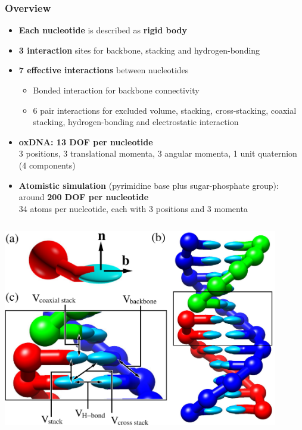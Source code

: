 \documentclass[slidestop,compress,9pt]{beamer}
\begin{document}
\begin{frame}
\frametitle{Overview}

\begin{itemize}
\item \textbf{Each nucleotide} is described as \textbf{rigid body}
\item \textbf{3 interaction} sites for backbone, stacking and hydrogen-bonding
\item \textbf{7 effective interactions} between nucleotides
\begin{itemize}
\item Bonded interaction for backbone connectivity
\item 6 pair interactions for excluded volume, stacking, cross-stacking, coaxial stacking, hydrogen-bonding and electrostatic interaction
\end{itemize}
\item \textbf{oxDNA: 13 DOF per nucleotide}\\
3 positions, 3 translational momenta, 3 angular momenta, 1 unit quaternion (4 components)
\item \textbf{Atomistic simulation} (pyrimidine base plus sugar-phosphate group):\\
around \textbf{200 DOF per nucleotide}\\
34 atoms per nucleotide, each with 3 positions and 3 momenta
\end{itemize}

\vspace*{-0.5cm}

\begin{columns}
\begin{column}{0.4\textwidth}
\begin{center}
\includegraphics[width=0.9\textwidth]{nucleotide_duplex_b.pdf}
\end{center}
\end{column}


\end{columns}
\end{frame}
\end{document}
